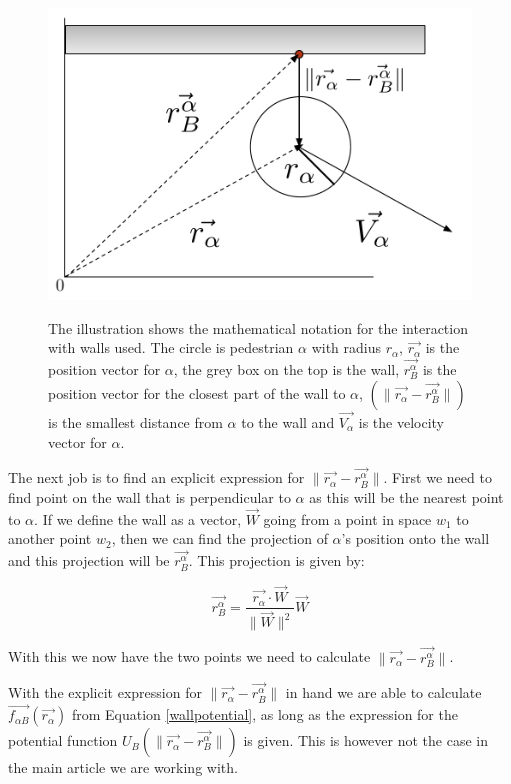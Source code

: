 \begin{figure}[ht]
\centering
{\includegraphics[scale=0.35]{Figures/NotationOfWall.pdf}} 
\caption[Notation of the interaction between an agent and a wall]{The illustration shows the mathematical notation for the interaction with walls used. The circle is pedestrian $\alpha$ with radius $r_{\alpha}$, $\vec{r_{\alpha}}$ is the position vector for $\alpha$, the grey box on the top is the wall, $\vec{r_{B}^{\alpha}}$ is the position vector for the closest part of the wall to $\alpha$, $\left( \| \vec{r_{\alpha}} - \vec{r_{B}^{\alpha}} \| \right)$ is the smallest distance from $\alpha$ to the wall and $\vec{V_{\alpha}}$ is the velocity vector for $\alpha$.}
\label{NotationOfWall}
\end{figure}

The next job is to find an explicit expression for $ \| \vec{r_{\alpha}} - \vec{r_{B}^{\alpha}} \|$.
First we need to find point on the wall that is perpendicular to $\alpha$ as 
this will be the nearest point to $\alpha$. If we define the wall as a vector, $\vec{W}$ going 
from a point in space $w_1$ to another point $w_2$, then we can find the projection of $\alpha$'s 
position onto the wall and this projection will be $\vec{r_{B}^{\alpha}}$. This projection is given by:

\begin{equation}\label{wall}
\vec{r_{B}^{\alpha}}=\frac{\vec{r_{\alpha}}\cdot \vec{W}}{\| \vec{W} \|^2}\vec{W}
\end{equation}

With this we now have the two points we need to calculate $\|\vec{r_{\alpha}} - \vec{r_{B}^{\alpha}}\|$.

With the explicit expression for $ \| \vec{r_{\alpha}} - \vec{r_{B}^{\alpha}} \| $ 
in hand we are able to calculate $\vec{f_{\alpha B}} \left( \vec{r_{\alpha}} \right)$ from 
Equation \ref{wallpotential}, as long as the expression for the potential function 
$U_{B}\left( \| \vec{r_{\alpha}} - \vec{r_{B}^{\alpha}} \| \right)$ is given. This is 
however not the case in the main article we are working with.

